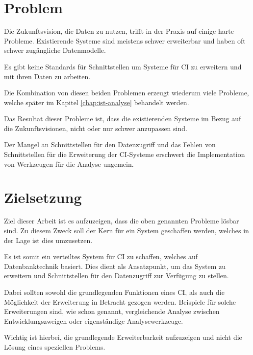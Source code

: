 


\section{Problem}

Die Zukunftsvision, die Daten zu nutzen,
trifft in der Praxis auf einige harte Probleme.
Existierende Systeme sind meistens schwer erweiterbar und haben oft schwer zugängliche Datenmodelle.

Es gibt keine Standards für Schnittstellen um Systeme für \ac{CI} zu erweitern und mit ihren Daten zu arbeiten.

Die Kombination von diesen beiden Problemen erzeugt wiederum viele Probleme,
welche später im Kapitel \ref{chap:ist-analyse} behandelt werden.

Das Resultat dieser Probleme ist, dass die existierenden Systeme im Bezug auf die Zukunftsvisionen,
nicht oder nur schwer anzupassen sind.

Der Mangel an Schnittstellen für den Datenzugriff und
das Fehlen von Schnittstellen für die Erweiterung der \ac{CI}-Systeme
erschwert die Implementation von Werkzeugen für die Analyse ungemein.


\section{Zielsetzung}
Ziel dieser Arbeit ist es aufzuzeigen, dass die oben genannten Probleme lösbar sind.
Zu diesem Zweck soll der Kern für ein System geschaffen werden,
welches in der Lage ist dies umzusetzen.

Es ist somit ein verteiltes System für \ac{CI} zu schaffen,
welches auf Datenbanktechnik basiert.
Dies dient als Ansatzpunkt, um das System zu erweitern und
Schnittstellen für den Datenzugriff zur Verfügung zu stellen.

Dabei sollten sowohl die grundlegenden Funktionen eines \ac{CI},
als auch die Möglichkeit der Erweiterung in Betracht gezogen werden.
Beispiele für solche Erweiterungen sind, wie schon genannt,
vergleichende Analyse zwischen Entwicklungszweigen oder eigenständige Analysewerkzeuge.

Wichtig ist hierbei, die grundlegende Erweiterbarkeit aufzuzeigen
und nicht die Lösung eines speziellen Problems.

